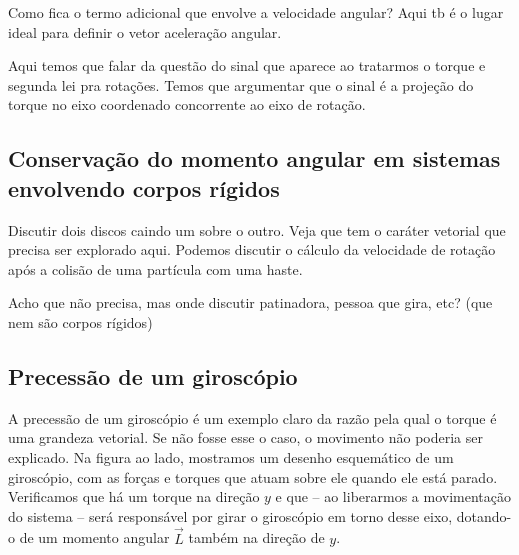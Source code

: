 Como fica o termo adicional que envolve a velocidade angular? Aqui tb é o lugar ideal para definir o vetor aceleração angular.

Aqui temos que falar da questão do sinal que aparece ao tratarmos o torque e segunda lei pra rotações. Temos que argumentar que o sinal é a projeção do torque no eixo coordenado concorrente ao eixo de rotação.

\subsection{Conservação do momento angular em sistemas envolvendo corpos rígidos}

Discutir dois discos caindo um sobre o outro. Veja que tem o caráter vetorial que precisa ser explorado aqui. Podemos discutir o cálculo da velocidade de rotação após a colisão de uma partícula com uma haste.

Acho que não precisa, mas onde discutir patinadora, pessoa que gira, etc? (que nem são corpos rígidos)

\subsection{Precessão de um giroscópio}


A precessão de um giroscópio é um exemplo claro da razão pela qual o torque é uma grandeza vetorial. Se não fosse esse o caso, o movimento não poderia ser explicado. Na figura ao lado, mostramos um desenho esquemático de um giroscópio, com as forças e torques que atuam sobre ele quando ele está parado. Verificamos que há um torque na direção $y$ e que -- ao liberarmos a movimentação do sistema -- será responsável por girar o giroscópio em torno desse eixo, dotando-o de um momento angular $\vec{L}$ também na direção de $y$.

